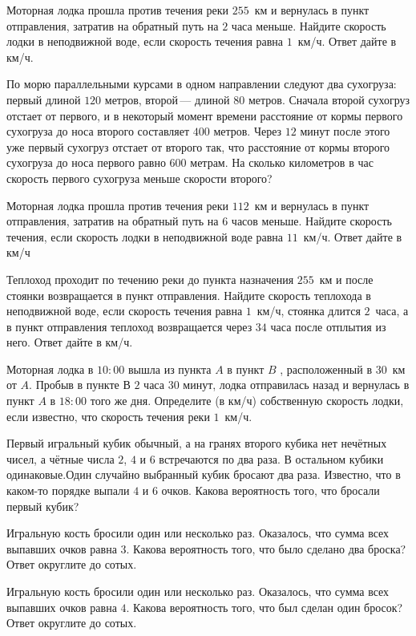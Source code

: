 \begin{class}[number=4]
\begin{listofex}
		\item Моторная лодка прошла против течения реки \( 255 \)  км и вернулась в пункт отправления, затратив на обратный путь на \( 2 \)  часа меньше. Найдите скорость лодки в неподвижной воде, если скорость течения равна \( 1 \)  км/ч. Ответ дайте в км/ч.
		\item По морю параллельными курсами в одном направлении следуют два сухогруза: первый длиной \( 120 \)  метров, второй --- длиной \( 80 \)  метров. Сначала второй сухогруз отстает от первого, и в некоторый момент времени расстояние от кормы первого сухогруза до носа второго составляет \( 400  \) метров. Через \( 12 \) минут после этого уже первый сухогруз отстает от второго так, что расстояние от кормы второго сухогруза до носа первого равно \( 600 \)  метрам. На сколько километров в час скорость первого сухогруза меньше скорости второго?
		\item Моторная лодка прошла против течения реки \( 112 \)  км и вернулась в пункт отправления, затратив на обратный путь на \( 6 \)  часов меньше. Найдите скорость течения, если скорость лодки в неподвижной воде равна \( 11 \)  км/ч. Ответ дайте в км/ч
		\item Теплоход проходит по течению реки до пункта назначения \( 255 \)  км и после стоянки возвращается в пункт отправления. Найдите скорость теплохода в неподвижной воде, если скорость течения равна \( 1 \)  км/ч, стоянка длится \( 2 \)  часа, а в пункт отправления теплоход возвращается через \( 34 \)  часа после отплытия из него. Ответ дайте в км/ч.
		\item Моторная лодка в \( 10:00 \)  вышла из пункта \( A \) в пункт \( B \) , расположенный в \( 30 \)  км от \( A \). Пробыв в пункте В \( 2 \)  часа \( 30 \)  минут, лодка отправилась назад и вернулась в пункт \( A \)  в \( 18:00 \) того же дня. Определите (в км/ч) собственную скорость лодки, если известно, что скорость течения реки \( 1 \)  км/ч.
		\item Первый игральный кубик обычный, а на гранях второго кубика нет нечётных чисел, а чётные числа \( 2 \), \( 4 \) и \( 6 \) встречаются по два раза. В остальном кубики одинаковые.Один случайно выбранный кубик бросают два раза. Известно, что в каком-то порядке выпали \( 4 \) и \( 6 \) очков. Какова вероятность того, что бросали первый кубик?
		\item Игральную кость бросили один или несколько раз. Оказалось, что сумма всех выпавших очков равна \( 3 \). Какова вероятность того, что было сделано два броска? Ответ округлите до сотых.
		\item Игральную кость бросили один или несколько раз. Оказалось, что сумма всех выпавших очков равна \( 4 \). Какова вероятность того, что был сделан один бросок? Ответ округлите до сотых.

\end{listofex}
\end{class}
